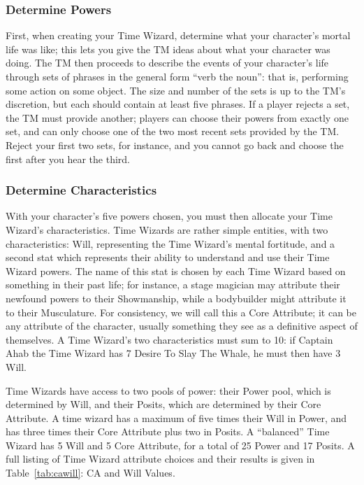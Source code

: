 \documentclass{article}
\begin{document}
\subsubsection{Determine Powers} \label{ssec:get-powers}
First, when creating your Time Wizard, determine what your character's mortal life was like;
this lets you give the TM ideas about what your character was doing. The TM then proceeds to
describe the events of your character's life through sets of phrases in the general form
``verb the noun'': that is, performing some action on some object. The size and number of the
sets is up to the TM's discretion, but each should contain at least five phrases. If a player
rejects a set, the TM must provide another; players can choose their powers from exactly one
set, and can only choose one of the two most recent sets provided by the TM. Reject your first
two sets, for instance, and you cannot go back and choose the first after you hear the third.

\subsubsection{Determine Characteristics} \label{ssec:get-characteristics}
With your character's five powers chosen, you must then allocate your Time Wizard's
characteristics. Time Wizards are rather simple entities, with two characteristics: Will,
representing the Time Wizard's mental fortitude, and a second stat which represents their
ability to understand and use their Time Wizard powers. The name of this stat is chosen by each
Time Wizard based on something in their past life; for instance, a stage magician may attribute
their newfound powers to their Showmanship, while a bodybuilder might attribute it to their
Musculature. For consistency, we will call this a Core Attribute; it can be any attribute of the
character, usually something they see as a definitive aspect of themselves. A Time Wizard's two
characteristics must sum to 10: if Captain Ahab the Time Wizard has 7 Desire To Slay The Whale,
he must then have 3 Will.

Time Wizards have access to two pools of power: their Power pool, which is determined by Will,
and their Posits, which are determined by their Core Attribute. A time wizard has a maximum of
five times their Will in Power, and has three times their Core Attribute plus two in Posits.
A ``balanced'' Time Wizard has 5 Will and 5 Core Attribute, for a total of 25 Power and 17
Posits. A full listing of Time Wizard attribute choices and their results is given in
Table~\ref{tab:cawill}: CA and Will Values.
\end{document}
